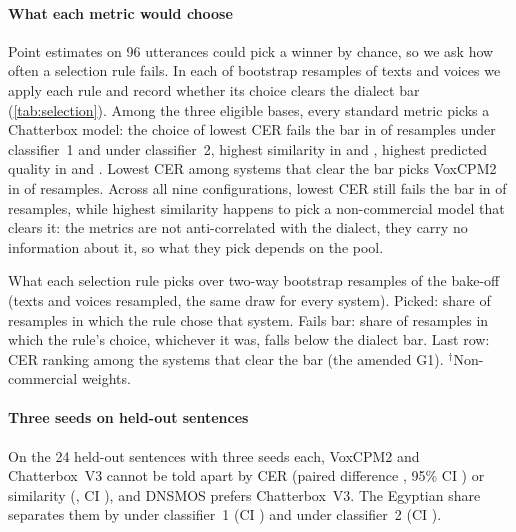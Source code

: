 \documentclass[11pt]{article}
\newcommand{\vox}{VoxCPM2\xspace}
\newcommand{\cbthree}{Chatterbox~V3\xspace}
\begin{document}
\paragraph{What each metric would choose}
Point estimates on 96 utterances could pick a winner by chance, so we ask how often a selection rule fails. In each of
 bootstrap resamples of texts and voices we apply each rule and record whether its choice clears the dialect bar
(\cref{tab:selection}). Among the three eligible bases, every standard metric picks a Chatterbox model:
the choice of lowest CER fails the bar in  of resamples under classifier~1 and
 under classifier~2, highest similarity in  and
, highest predicted quality in  and
. Lowest CER among systems that clear the bar picks \vox in
 of resamples. Across all nine configurations, lowest CER still fails the bar in
 of resamples, while highest similarity happens to pick a non-commercial model that clears it: the
metrics are not anti-correlated with the dialect, they carry no information about it, so what they pick depends on the
pool.

\begin{table}[t]
\centering\small
\begin{adjustbox}{max width=\textwidth}
\end{adjustbox}
\caption{What each selection rule picks over  two-way bootstrap resamples of the bake-off (texts and voices
resampled, the same draw for every system). Picked: share of resamples in which the rule chose that system. Fails bar:
share of resamples in which the rule's choice, whichever it was, falls below the dialect bar. Last row: CER ranking among
the systems that clear the bar (the amended G1). $^\dagger$Non-commercial weights.}
\label{tab:selection}
\end{table}

\paragraph{Three seeds on held-out sentences}
On the 24 held-out sentences with three seeds each, \vox and \cbthree cannot be told apart by CER (paired difference
, 95\% CI ) or similarity
(, CI ), and DNSMOS
prefers \cbthree. The Egyptian share separates them by  under classifier~1
(CI ) and  under classifier~2 (CI
).
\end{document}
